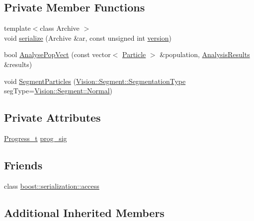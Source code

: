 \subsection*{Private Member Functions}
\begin{DoxyCompactItemize}
\item 
{\footnotesize template$<$class Archive $>$ }\\void \hyperlink{class_soil_analyzer_1_1_sample_a5be6eea7a7d74e0adec741d1e203635e}{serialize} (Archive \&ar, const unsigned int \hyperlink{class_soil_analyzer_1_1_soil_ac32132912c73338edf60b5cd6de4feb8}{version})
\item 
bool \hyperlink{class_soil_analyzer_1_1_sample_ab086f5475a5e404625b6ae1faa0fe7a2}{Analyse\+Pop\+Vect} (const vector$<$ \hyperlink{class_soil_analyzer_1_1_particle}{Particle} $>$ \&population, \hyperlink{class_soil_analyzer_1_1_analysis_results}{Analysis\+Results} \&results)
\item 
void \hyperlink{class_soil_analyzer_1_1_sample_a38d665f29d94e597cb4c6a467d2e1f0b}{Segment\+Particles} (\hyperlink{class_vision_1_1_segment_af3a2b992526eac54bca53e34cf2db4da}{Vision\+::\+Segment\+::\+Segmentation\+Type} seg\+Type=\hyperlink{class_vision_1_1_segment_af3a2b992526eac54bca53e34cf2db4daae000cfc8d629752d6cdbba0d3d750184}{Vision\+::\+Segment\+::\+Normal})
\end{DoxyCompactItemize}
\subsection*{Private Attributes}
\begin{DoxyCompactItemize}
\item 
\hyperlink{class_soil_analyzer_1_1_sample_a745151be7222e75b39268c46b16a9899}{Progress\+\_\+t} \hyperlink{class_soil_analyzer_1_1_sample_aab3a7522152890650245a1f069605a13}{prog\+\_\+sig}
\end{DoxyCompactItemize}
\subsection*{Friends}
\begin{DoxyCompactItemize}
\item 
class \hyperlink{class_soil_analyzer_1_1_sample_ac98d07dd8f7b70e16ccb9a01abf56b9c}{boost\+::serialization\+::access}
\end{DoxyCompactItemize}
\subsection*{Additional Inherited Members}


